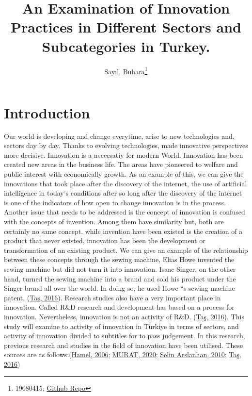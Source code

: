 \documentclass[
  12pt,
]{article}
\title{An Examination of Innovation Practices in Different Sectors and Subcategories in Turkey.}
\author{Sayıl, Buhara\footnote{19080415, \href{https://github.com/Buharas/19080415.git}{Github Repo}}}
\date{}
\begin{document}
\maketitle

\hypertarget{introduction}{%
\section{Introduction}\label{introduction}}

Our world is developing and change everytime, arise to new technologies and, sectors day by day. Thanks to evolving technologies, made innovative perspectives more decisive. Innovation is a neccesatiy for modern World. Innovation has been created new areas in the business life. The areas have pioneered to welfare and public interest with economically growth. As an example of this, we can give the innovations that took place after the discovery of the internet, the use of artificial intelligence in today's conditions after so long after the discovery of the internet is one of the indicators of how open to change innovation is in the process. Another issue that needs to be addressed is the concept of innovation is confused with the concepts of invention. Among them have similarity but, both are certainly no same concept. while invention have been existed is the creation of a product that never existed, innovation has been the development or transformation of an existing product. We can give an example of the relationship between these concepts through the sewing machine, Elias Howe invented the sewing machine but did not turn it into innovation. Isaac Singer, on the other hand, turned the sewing machine into a brand and sold his product under the Singer brand all over the world. In doing so, he used Howe ``s sewing machine patent. (\protect\hyperlink{ref-taux15f:2016}{Taş, 2016}). Research studies also have a very important place in innovation. Called R\&D research and development has based on a process for innovation. Nevertheless, innovation is not an activity of R\&D. (\protect\hyperlink{ref-taux15f:2016}{Taş, 2016}). This study will examine to activity of innovation in Türkiye in terms of sectors, and activity of innovation divided to subtitles for to pass judgement. In this research, previous research and studies in the field of innovation have been utilised. These sources are as follows:(\protect\hyperlink{ref-hamel:2006}{Hamel, 2006}; \protect\hyperlink{ref-murat:2020}{MURAT, 2020}; \protect\hyperlink{ref-arslanhan:2010}{Selin Arslanhan, 2010}; \protect\hyperlink{ref-taux15f:2016}{Taş, 2016})
\end{document}
